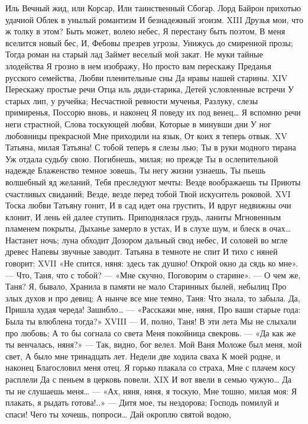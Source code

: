 Иль Вечный жид, или Корсар,
Или таинственный Сбогар.
Лорд Байрон прихотью удачной
Облек в унылый романтизм
И безнадежный эгоизм.
XIII
Друзья мои, что ж толку в этом?
Быть может, волею небес,
Я перестану быть поэтом,
В меня вселится новый бес,
И, Фебовы презрев угрозы,
Унижусь до смиренной прозы;
Тогда роман на старый лад
Займет веселый мой закат.
Не муки тайные злодейства
Я грозно в нем изображу,
Но просто вам перескажу
Преданья русского семейства,
Любви пленительные сны
Да нравы нашей старины.
XIV
Перескажу простые речи
Отца иль дяди-старика,
Детей условленные встречи
У старых лип, у ручейка;
Несчастной ревности мученья,
Разлуку, слезы примиренья,
Поссорю вновь, и наконец
Я поведу их под венец…
Я вспомню речи неги страстной,
Слова тоскующей любви,
Которые в минувши дни
У ног любовницы прекрасной
Мне приходили на язык,
От коих я теперь отвык.
XV
Татьяна, милая Татьяна!
С тобой теперь я слезы лью;
Ты в руки модного тирана
Уж отдала судьбу свою.
Погибнешь, милая; но прежде
Ты в ослепительной надежде
Блаженство темное зовешь,
Ты негу жизни узнаешь,
Ты пьешь волшебный яд желаний,
Тебя преследуют мечты:
Везде воображаешь ты
Приюты счастливых свиданий;
Везде, везде перед тобой
Твой искуситель роковой.
XVI
Тоска любви Татьяну гонит,
И в сад идет она грустить,
И вдруг недвижны очи клонит,
И лень ей далее ступить.
Приподнялася грудь, ланиты
Мгновенным пламенем покрыты,
Дыханье замерло в устах,
И в слухе шум, и блеск в очах…
Настанет ночь; луна обходит
Дозором дальный свод небес,
И соловей во мгле древес
Напевы звучные заводит.
Татьяна в темноте не спит
И тихо с няней говорит:
XVII
«Не спится, няня: здесь так душно!
Открой окно да сядь ко мне».
— Что, Таня, что с тобой? — «Мне скучно,
Поговорим о старине».
— О чем же, Таня? Я, бывало,
Хранила в памяти не мало
Старинных былей, небылиц
Про злых духов и про девиц;
А нынче все мне темно, Таня:
Что знала, то забыла. Да,
Пришла худая череда!
Зашибло… — «Расскажи мне, няня,
Про ваши старые года:
Была ты влюблена тогда?»
XVIII
— И, полно, Таня! В эти лета
Мы не слыхали про любовь;
А то бы согнала со света
Меня покойница свекровь. —
«Да как же ты венчалась, няня?»
— Так, видно, бог велел. Мой Ваня
Моложе был меня, мой свет,
А было мне тринадцать лет.
Недели две ходила сваха
К моей родне, и наконец
Благословил меня отец.
Я горько плакала со страха,
Мне с плачем косу расплели
Да с пеньем в церковь повели.
XIX
И вот ввели в семью чужую…
Да ты не слушаешь меня… —
«Ах, няня, няня, я тоскую,
Мне тошно, милая моя:
Я плакать, я рыдать готова!..»
— Дитя мое, ты нездорова;
Господь помилуй и спаси!
Чего ты хочешь, попроси…
Дай окроплю святой водою,
